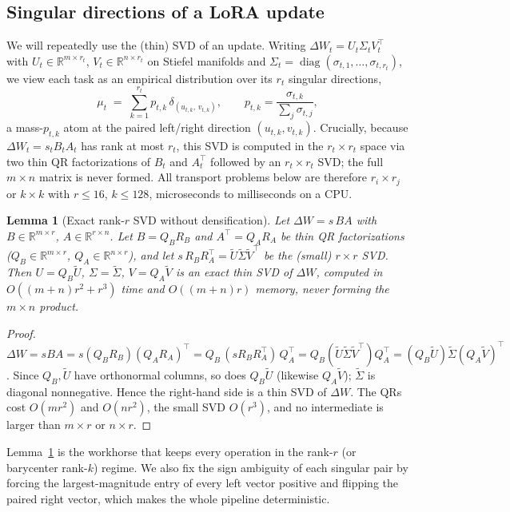 \documentclass[11pt]{article}
\newtheorem{lemma}{Lemma}
\newcommand{\dW}{\Delta W}
\newcommand{\R}{\mathbb{R}}
\newcommand{\diag}{\operatorname{diag}}
\begin{document}
\subsection{Singular directions of a LoRA update}
We will repeatedly use the (thin) SVD of an update. Writing
$\dW_t = U_t \Sigma_t V_t^\top$ with $U_t\in\R^{m\times r_t}$, $V_t\in\R^{n\times r_t}$ on Stiefel
manifolds and $\Sigma_t=\diag(\sigma_{t,1},\dots,\sigma_{t,r_t})$, we view each task as an empirical
distribution over its $r_t$ singular directions,
\begin{equation}
\mu_t \;=\; \sum_{k=1}^{r_t} p_{t,k}\,\delta_{(u_{t,k},\,v_{t,k})},
\qquad p_{t,k} = \frac{\sigma_{t,k}}{\sum_j \sigma_{t,j}},
\label{eq:dirdist}
\end{equation}
a mass-$p_{t,k}$ atom at the paired left/right direction $(u_{t,k},v_{t,k})$. Crucially, because
$\dW_t = s_t B_t A_t$ has rank at most $r_t$, this SVD is computed in the $r_t\times r_t$ space via two
thin QR factorizations of $B_t$ and $A_t^\top$ followed by an $r_t\times r_t$ SVD; the full
$m\times n$ matrix is never formed. All transport problems below are therefore $r_i\times r_j$ or
$k\times k$ with $r\le 16$, $k\le128$, microseconds to milliseconds on a CPU.

\begin{lemma}[Exact rank-$r$ SVD without densification]
\label{lem:thinsvd}
Let $\dW = s\,BA$ with $B\in\R^{m\times r}$, $A\in\R^{r\times n}$. Let $B=Q_B R_B$ and $A^\top=Q_A R_A$
be thin QR factorizations ($Q_B\in\R^{m\times r}$, $Q_A\in\R^{n\times r}$), and let
$s\,R_B R_A^\top = \tilde U \tilde\Sigma \tilde V^\top$ be the (small) $r\times r$ SVD. Then
$U=Q_B\tilde U$, $\Sigma=\tilde\Sigma$, $V=Q_A\tilde V$ is an exact thin SVD of $\dW$, computed in
$O((m+n)r^2 + r^3)$ time and $O((m+n)r)$ memory, never forming the $m\times n$ product.
\end{lemma}
\begin{proof}
$\dW = sBA = s(Q_BR_B)(Q_AR_A)^\top = Q_B\,(sR_BR_A^\top)\,Q_A^\top = Q_B(\tilde U\tilde\Sigma\tilde V^\top)Q_A^\top
= (Q_B\tilde U)\tilde\Sigma(Q_A\tilde V)^\top$.
Since $Q_B,\tilde U$ have orthonormal columns, so does $Q_B\tilde U$ (likewise $Q_A\tilde V$); $\tilde\Sigma$
is diagonal nonnegative. Hence the right-hand side is a thin SVD of $\dW$. The QRs cost $O(mr^2)$ and
$O(nr^2)$, the small SVD $O(r^3)$, and no intermediate is larger than $m\times r$ or $n\times r$.
\end{proof}

\noindent Lemma~\ref{lem:thinsvd} is the workhorse that keeps every operation in the rank-$r$ (or
barycenter rank-$k$) regime. We also fix the sign ambiguity of each singular pair by forcing the
largest-magnitude entry of every left vector positive and flipping the paired right vector, which makes
the whole pipeline deterministic.
\end{document}

